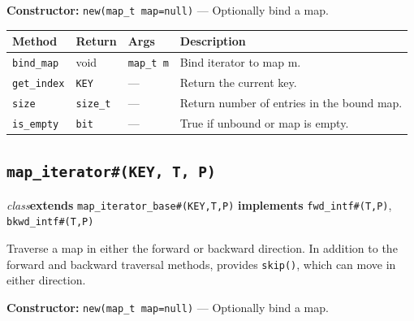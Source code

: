 \documentclass[11pt,letterpaper]{report}
\begin{document}
\noindent\textbf{Constructor:} \texttt{new(map\_t map=null)} --- Optionally bind a map.

\begin{xltabular}{\linewidth}{>{\small}p{1.35in} >{\small}p{1.25in} >{\small}p{0.95in} >{\small}X}
\toprule
\textbf{Method} & \textbf{Return} & \textbf{Args} & \textbf{Description} \\
\midrule
\endhead
\bottomrule
\endfoot
\texttt{bind\_map} & void & \texttt{map\_t m} & Bind iterator to map m. \\
\texttt{get\_index} & \texttt{KEY} & --- & Return the current key. \\
\texttt{size} & \texttt{size\_t} & --- & Return number of entries in the bound map. \\
\texttt{is\_empty} & \texttt{bit} & --- & True if unbound or map is empty. \\
\end{xltabular}

\subsection*{\texttt{map\_iterator\#(KEY, T, P)}}
\noindent\small\textit{class}\quad \textbf{extends} \texttt{map\_iterator\_base\#(KEY,T,P)} \quad \textbf{implements} \texttt{fwd\_intf\#(T,P)}, \texttt{bkwd\_intf\#(T,P)}\par

Traverse a map in either the forward or backward direction. In addition to the forward and backward traversal methods, provides \texttt{skip()}, which can move in either direction.

\noindent\textbf{Constructor:} \texttt{new(map\_t map=null)} --- Optionally bind a map.
\end{document}
